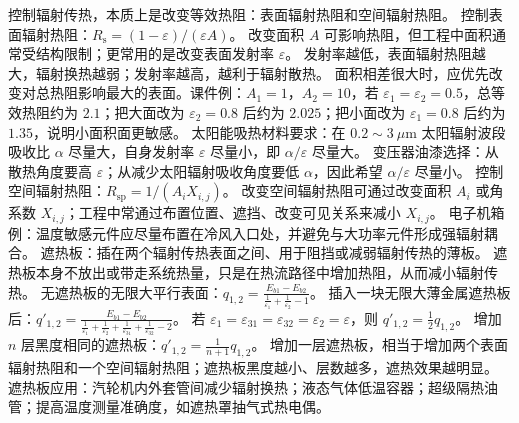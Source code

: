 
控制辐射传热，本质上是改变等效热阻：表面辐射热阻和空间辐射热阻。
控制表面辐射热阻：$R_{\mathrm{s}}=(1-\varepsilon)/(\varepsilon A)$。
改变面积 $A$ 可影响热阻，但工程中面积通常受结构限制；更常用的是改变表面发射率 $\varepsilon$。
发射率越低，表面辐射热阻越大，辐射换热越弱；发射率越高，越利于辐射散热。
面积相差很大时，应优先改变对总热阻影响最大的表面。课件例：$A_1=1$，$A_2=10$，若 $\varepsilon_1=\varepsilon_2=0.5$，总等效热阻约为 $2.1$；把大面改为 $\varepsilon_2=0.8$ 后约为 $2.025$；把小面改为 $\varepsilon_1=0.8$ 后约为 $1.35$，说明小面积面更敏感。
太阳能吸热材料要求：在 $0.2\sim3\ \mu\mathrm{m}$ 太阳辐射波段吸收比 $\alpha$ 尽量大，自身发射率 $\varepsilon$ 尽量小，即 $\alpha/\varepsilon$ 尽量大。
变压器油漆选择：从散热角度要高 $\varepsilon$；从减少太阳辐射吸收角度要低 $\alpha$，因此希望 $\alpha/\varepsilon$ 尽量小。
控制空间辐射热阻：$R_{\mathrm{sp}}=1/(A_iX_{i,j})$。
改变空间辐射热阻可通过改变面积 $A_i$ 或角系数 $X_{i,j}$；工程中常通过布置位置、遮挡、改变可见关系来减小 $X_{i,j}$。
电子机箱例：温度敏感元件应尽量布置在冷风入口处，并避免与大功率元件形成强辐射耦合。
遮热板：插在两个辐射传热表面之间、用于阻挡或减弱辐射传热的薄板。
遮热板本身不放出或带走系统热量，只是在热流路径中增加热阻，从而减小辐射传热。
无遮热板的无限大平行表面：$q_{1,2}=\frac{E_{b1}-E_{b2}}{\frac{1}{\varepsilon_1}+\frac{1}{\varepsilon_2}-1}$。
插入一块无限大薄金属遮热板后：$q'_{1,2}=\frac{E_{b1}-E_{b2}}{\frac{1}{\varepsilon_1}+\frac{1}{\varepsilon_2}+\frac{1}{\varepsilon_{31}}+\frac{1}{\varepsilon_{32}}-2}$。
若 $\varepsilon_1=\varepsilon_{31}=\varepsilon_{32}=\varepsilon_2=\varepsilon$，则 $q'_{1,2}=\frac{1}{2}q_{1,2}$。
增加 $n$ 层黑度相同的遮热板：$q'_{1,2}=\frac{1}{n+1}q_{1,2}$。
增加一层遮热板，相当于增加两个表面辐射热阻和一个空间辐射热阻；遮热板黑度越小、层数越多，遮热效果越明显。
遮热板应用：汽轮机内外套管间减少辐射换热；液态气体低温容器；超级隔热油管；提高温度测量准确度，如遮热罩抽气式热电偶。

\divider


